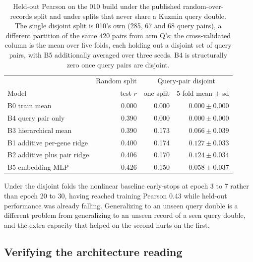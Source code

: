 \iflong
\begin{table}[htbp]
\centering
\footnotesize
\caption{Held-out Pearson on the 010 build under the published random-over-records
split and under splits that never share a Kuzmin query double. The single disjoint
split is 010's own (285, 67 and 68 query pairs), a different partition of the same
420 pairs from arm Q's; the cross-validated column is the mean over five folds, each
holding out a disjoint set of query pairs, with B5 additionally averaged over three
seeds. B4 is structurally zero once query pairs are disjoint.}
\label{tab:disjoint}
\begin{tabular}{lrrr}
\toprule
& \multicolumn{1}{c}{Random split} & \multicolumn{2}{c}{Query-pair disjoint} \\
Model & test $r$ & one split & 5-fold mean $\pm$ sd \\
\midrule
B0 train mean & 0.000 & 0.000 & $0.000 \pm 0.000$ \\
B4 query pair only & 0.390 & 0.000 & $0.000 \pm 0.000$ \\
B3 hierarchical mean & 0.390 & 0.173 & $0.066 \pm 0.039$ \\
B1 additive per-gene ridge & 0.400 & 0.174 & $0.127 \pm 0.033$ \\
B2 additive plus pair ridge & 0.406 & 0.170 & $0.124 \pm 0.034$ \\
B5 embedding MLP & 0.426 & 0.150 & $0.058 \pm 0.037$ \\
\bottomrule
\end{tabular}
\end{table}

Under the disjoint folds the nonlinear baseline early-stops at epoch 3 to 7 rather
than epoch 20 to 30, having reached training Pearson 0.43 while held-out
performance was already falling. Generalizing to an unseen query double is a
different problem from generalizing to an unseen record of a seen query double, and
the extra capacity that helped on the second hurts on the first.

\subsection{Verifying the architecture reading}
\label{sec:verify}

